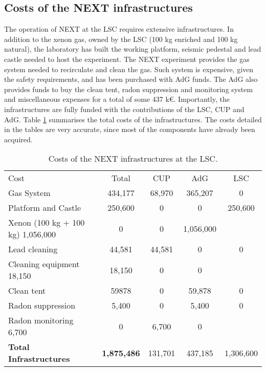 \subsection{Costs of the NEXT infrastructures}
The operation of NEXT at the LSC requires extensive infrastructures. In addition to the xenon gas, owned by the LSC (100 kg enriched and 100 kg natural), the laboratory has built the working platform, seismic pedestal and lead castle needed to host the experiment. The NEXT experiment provides the gas system needed to recirculate and clean the gas. Such system is expensive, given the safety requirements, and has been purchased with AdG funds. The AdG also provides funds to buy the clean tent, radon suppression and monitoring system and miscellaneous expenses for a total of some
437 k\euro. Importantly, the infrastructures are fully funded with the contributions of the LSC, CUP and AdG. 
Table \ref{tab.n100:INFRA} summarises the total costs of the infrastructures. The costs detailed in the tables are very accurate, since most of the components have already been acquired. 


  
\begin{table}[h!]
\begin{center}
\begin{tabular}{|l|c|c|c|c|}
\hline
 Cost &	Total& 	CUP & AdG &  LSC \\
 \vline
Gas System &	434,177 &	68,970 &	365,207 &	0 \\
Platform and Castle	& 250,600 & 	0	&0 &	250,600 \\
Xenon (100 kg + 100 kg)	1,056,000	& 0 & 0 &	1,056,000 \\
Lead cleaning	& 44,581 &44,581 &	0 & 0 \\
Cleaning equipment	18,150	& 18,150	& 0	& 0	\\
Clean tent	 & 59878	&	0& 59,878 &	0	\\
Radon suppression 	& 5,400 &	0 &	5,400 &	0	\\
Radon monitoring	6,700 &	0	& 6,700	& 0	\\
 \hline
{\bf Total Infrastructures} &	{\bf1,875,486}& 131,701& 437,185 & 1,306,600 \\	
 \hline\hline
\end{tabular}  
\caption{Costs of the NEXT infrastructures at the LSC.}
\label{tab.n100:INFRA}
\end{center}
\end{table} 

